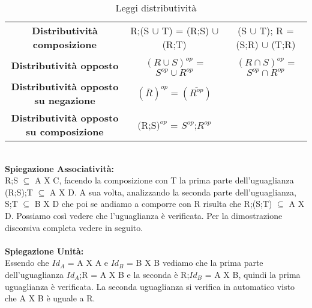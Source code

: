 \begin{table}[h!]
    \vspace{-10pt}
    \centering
    \setlength{\tabcolsep}{8pt}
    \renewcommand{\arraystretch}{2}
    \begin{tabular}{|c|c|c|}
        \hline
        \textbf{Distributività composizione} & R;(S $\cup$ T) = (R;S) $\cup$ (R;T) & (S $\cup$ T); R = (S;R) $\cup$ (T;R) \\
        \textbf{Distributività opposto} & $(R \cup S)^{op}$ = $S^{op} \cup R^{op}$ & $(R \cap S)^{op}$ = $S^{op} \cap R^{op}$ \\
        \textbf{Distributività opposto su negazione} & $(\overline{R})^{op} = (\overline{R^{op}})$ & \\
        \textbf{Distributività opposto su composizione} & $($R;S$)^{op}$ = $S^{op}$;$R^{op}$ & \\ \hline
    \end{tabular}
    \caption{Leggi distributività}
    \label{tab:leggi-distributività}
\end{table}
\\
\textbf{Spiegazione Associatività:}\\
R;S $\subseteq$ A X C, facendo la composizione con T la prima parte dell'uguaglianza (R;S);T $\subseteq$ A X D. A sua volta, analizzando la seconda parte dell'uguaglianza, S;T $\subseteq$ B X D che poi se andiamo a comporre con R risulta che R;(S;T) $\subseteq$ A X D. Possiamo così vedere che l'uguaglianza è verificata. Per la dimostrazione discorsiva completa vedere in seguito. \\ \\
\textbf{Spiegazione Unità:}\\
Essendo che $Id_A$ = A X A e $Id_B$ = B X B vediamo che la prima parte dell'uguaglianza $Id_A$;R = A X B e la seconda è R;$Id_B$ = A X B, quindi la prima uguaglianza è verificata. La seconda uguaglianza si verifica in automatico visto che A X B è uguale a R.


